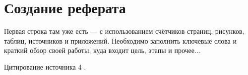 \section{Создание реферата}

Первая строка там уже есть --- с использованием счётчиков страниц, рисунков, 
таблиц, источников и приложений. 
Необходимо заполнить ключевые слова и краткий обзор своей работы, 
куда входит цель, этапы и прочее...

\lipsum[1-4]

Цитирование источника 4 \cite{Wikipedia4} \cite{cite_1_2} \cite{cite_1_15} \cite{cite_1_16}.

